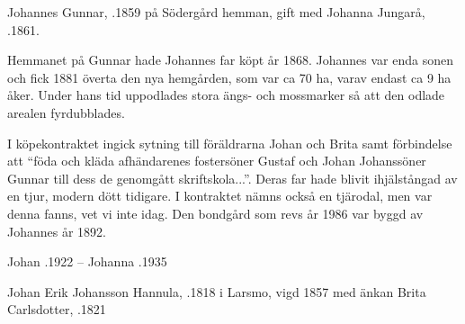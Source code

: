 Johannes Gunnar, .1859 på Södergård hemman, gift med Johanna Jungarå, .1861.

\begin{jhchildren}
  \item {}
  \item {}
  \item {}
  \item {}
  \item {}
  \item {}
  \item {}
  \item {}
  \item {}
  \item {}
  \item {}
  \item {}
\end{jhchildren}

Hemmanet på Gunnar hade Johannes far köpt år 1868. Johannes var enda sonen och fick 1881 överta den nya hemgården, som var ca 70 ha, varav endast ca 9 ha åker. Under hans tid uppodlades stora ängs- och mossmarker så att den odlade arealen fyrdubblades.

I köpekontraktet ingick sytning till föräldrarna Johan och Brita samt förbindelse att ``föda och kläda afhändarenes fostersöner Gustaf och Johan Johanssöner Gunnar till dess de genomgått skriftskola...''. Deras far hade blivit ihjälstångad av en tjur, modern dött tidigare. I kontraktet nämns också en tjärodal, men var denna fanns, vet vi inte idag. Den bondgård som revs år 1986 var byggd av Johannes  år 1892.

Johan .1922  --  Johanna .1935


Johan Erik Johansson Hannula, .1818 i Larsmo, vigd 1857 med änkan Brita Carlsdotter, .1821

